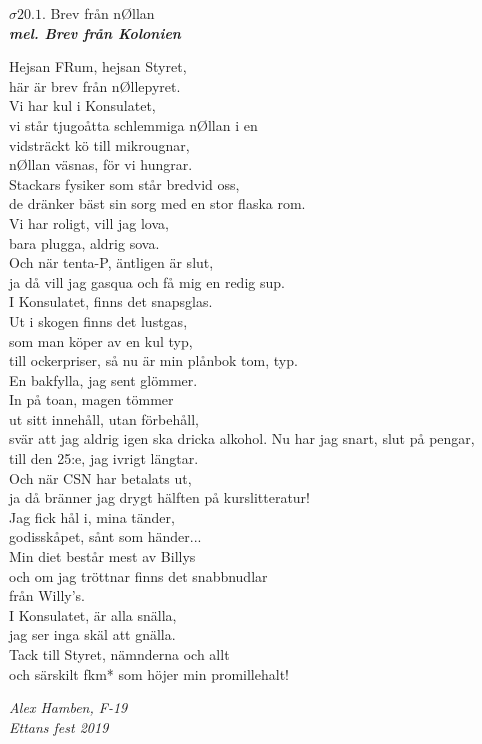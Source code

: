 \documentclass[a6paper,10pt]{article}
\newcommand{\mel}[1]{\small\textbf{\textit{mel. #1 \\}}}
\begin{document}
\begin{center}
\Large $\sigma20.1$. Brev från nØllan\\
\mel{Brev från Kolonien} 
\end{center}
\small Hejsan FRum, hejsan Styret,\\
här är brev från nØllepyret.\\
Vi har kul i Konsulatet,\\
vi står tjugoåtta schlemmiga nØllan i en
\vspace{5pt}\\
vidsträckt kö till mikrougnar,\\
nØllan väsnas, för vi hungrar.\\
Stackars fysiker som står bredvid oss,\\
de dränker bäst sin sorg med en stor flaska rom.
\vspace{5pt}\\
Vi har roligt, vill jag lova,\\
bara plugga, aldrig sova.\\
Och när tenta-P, äntligen är slut,\\
ja då vill jag gasqua och få mig en redig sup.
\vspace{5pt}\\
I Konsulatet, finns det snapsglas.\\
Ut i skogen finns det lustgas,\\
som man köper av en kul typ,\\
till ockerpriser, så nu är min plånbok tom, typ.
\vspace{5pt}\\
En bakfylla, jag sent glömmer.\\
In på toan, magen tömmer\\
ut sitt innehåll, utan förbehåll,\\
svär att jag aldrig igen ska dricka alkohol.
\setlength{\oddsidemargin}{-0.47in}
\noindent
Nu har jag snart, slut på pengar,\\
till den 25:e, jag ivrigt längtar.\\
Och när CSN har betalats ut,\\
ja då bränner jag drygt hälften på kurslitteratur!
\vspace{5pt}\\
Jag fick hål i, mina tänder,\\
godisskåpet, sånt som händer...\\
Min diet består mest av Billys\\
och om jag tröttnar finns det snabbnudlar \\ från Willy’s.
\vspace{5pt}\\
I Konsulatet, är alla snälla,\\
jag ser inga skäl att gnälla.\\
Tack till Styret, nämnderna och allt\\
och särskilt fkm* som höjer min promillehalt!
\begin{flushright}
\textit{Alex Hamben, F-19 \\Ettans fest 2019}
\end{flushright}
\end{document}

